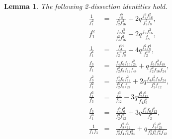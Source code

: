 \documentclass[12pt]{article}
\newtheorem{lemma}{Lemma}[section]
\begin{document}
\begin{lemma} The following 2-dissection identities hold.
\begin{eqnarray}
\frac{1}{f_{1}^{2}} & = & \frac{f_{8}^{5}}{f_{2}^{5}f_{16}^{2}} + 2q\frac{f_{4}^{2}f_{16}^{2}}{f_{2}^{5}f_{8}}, \label{Eq17} \\
{f_{1}^{2}} & = & \frac{f_{2}f_8^5}{f_{4}^{2}f_{16}^{2}} -2q\frac{f_{2}f_{16}^{2}}{f_{8}}, \label{Eq31} \\
\frac{1}{f_{1}^{4}} & = & \frac{f_{4}^{14}}{f_{2}^{14}f_{8}^{4}} + 4q\frac{f_{4}^{2}f_{8}^{4}}{f_{2}^{10}}, \label{Eq29} \\
\displaystyle\frac{f_{3}}{f_{1}} & = & \displaystyle\frac{f_{4}f_{6}f_{16}f_{24}^{2}}{f_{2}^{2}f_{8}f_{12}f_{48}} + q\displaystyle\frac{f_{6}f_{8}^{2}f_{48}}{f_{2}^{2}f_{16}f_{24}}, \label{Eq8} \\
\displaystyle\frac{f_{3}^2}{f_{1}^2} & = & \displaystyle\frac{f_{4}^4f_{6}f_{12}^{2}}{f_{2}^{5}f_{8}f_{24}} + 2q\displaystyle\frac{f_{4}f_{6}^{2}f_{8}f_{24}}{f_{2}^{4}f_{12}}, \label{Eq9} \\
\displaystyle\frac{f_{1}^3}{f_{3}} & = & \displaystyle\frac{f_{4}^3}{f_{12}} - 3q\displaystyle\frac{f_{2}^{2}f_{12}^3}{f_{4}f_{6}^2} \label{Eq45} \\
\displaystyle\frac{f_{3}}{f_{1}^3} & = & \displaystyle\frac{f_{4}^6f_{6}^3}{f_{2}^{9}f_{12}^2} + 3q\displaystyle\frac{f_{4}^2f_{6}f_{12}^2}{f_{2}^{7}}, \label{Eq11} \\
\displaystyle\frac{1}{f_{1}f_{3}} & = & \displaystyle\frac{f_{8}^{2}f_{12}^{5}}{f_{2}^{2}f_{4}f_{6}^{4}f_{24}^{2}} + q\displaystyle\frac{f_{4}^{5}f_{24}^{2}}{f_{2}^{4}f_{6}^{2}f_{8}^{2}f_{12}} \label{Eq38}
\end{eqnarray}
\end{lemma}
\end{document}
